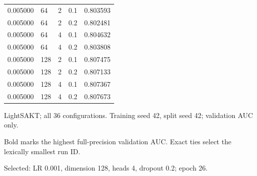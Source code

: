 \begin{table}[htbp]
{\begin{tabular}{lllll}
0.005000 & 64 & 2 & 0.1 & 0.803593 \\
0.005000 & 64 & 2 & 0.2 & 0.802481 \\
0.005000 & 64 & 4 & 0.1 & 0.804632 \\
0.005000 & 64 & 4 & 0.2 & 0.803808 \\
0.005000 & 128 & 2 & 0.1 & 0.807475 \\
0.005000 & 128 & 2 & 0.2 & 0.807133 \\
0.005000 & 128 & 4 & 0.1 & 0.807367 \\
0.005000 & 128 & 4 & 0.2 & 0.807673 \\
\bottomrule
\end{tabular}}
\begin{minipage}{\textwidth}\footnotesize
LightSAKT; all 36 configurations. Training seed 42, split seed 42; validation AUC only.\par Bold marks the highest full-precision validation AUC. Exact ties select the lexically smallest run ID.\par Selected: LR 0.001, dimension 128, heads 4, dropout 0.2; epoch 26.
\end{minipage}
\end{table}
